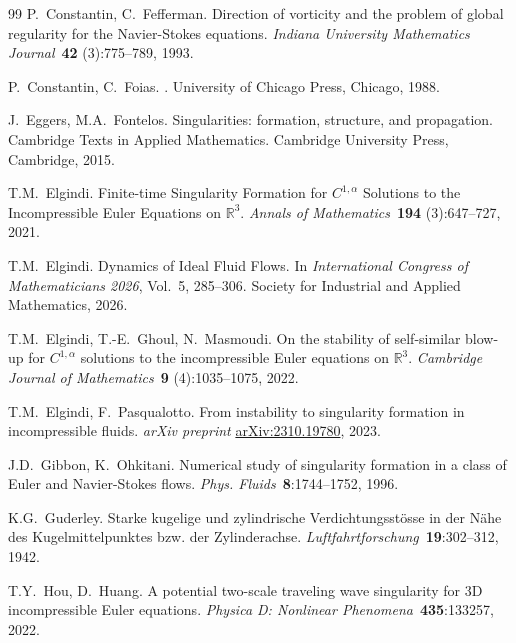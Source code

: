 \documentclass[11pt,reqno]{amsproc}
\numberwithin{equation}{section}
\theoremstyle{remark}
\begin{document}
\begin{thebibliography}{99}
P.~Constantin, C.~Fefferman. 
\newblock Direction of vorticity and the problem of global regularity for the Navier-Stokes equations. 
\newblock \textit{Indiana University Mathematics Journal}~\textbf{42} (3):775--789, 1993.

P.~Constantin, C.~Foias.
.
\newblock University of Chicago Press, Chicago, 1988.
 

J.~Eggers, M.A.~Fontelos.
\newblock Singularities: formation, structure, and propagation.
\newblock Cambridge Texts in Applied Mathematics. Cambridge University Press, Cambridge, 2015.  

T.M.~Elgindi.
\newblock Finite-time Singularity Formation for $C^{1,\alpha}$ Solutions to the Incompressible Euler Equations on $\mathbb{R}^3$. 
\newblock \textit{Annals of Mathematics}~\textbf{194} (3):647--727,  2021.

T.M.~Elgindi. 
\newblock Dynamics of Ideal Fluid Flows.
\newblock In \emph{International Congress of Mathematicians 2026},  Vol.~5, 285--306. Society for Industrial and Applied Mathematics, 2026.


T.M.~Elgindi, T.-E.~Ghoul, N.~Masmoudi. 
\newblock On the stability of self-similar blow-up for $C^{1,\alpha}$ solutions to the incompressible Euler equations on $\mathbb{R}^3$. 
\newblock \textit{Cambridge Journal of Mathematics}~\textbf{9} (4):1035--1075, 2022.

T.M.~Elgindi, F.~Pasqualotto. 
\newblock From instability to singularity formation in incompressible fluids.
\newblock \textit{arXiv preprint} \href{https://arxiv.org/abs/2310.19780}{arXiv:2310.19780}, 2023.

J.D.~Gibbon, K.~Ohkitani. 
\newblock Numerical study of singularity formation in a class of Euler and Navier-Stokes flows.
\newblock \textit{Phys. Fluids}~\textbf{8}:1744--1752, 1996.


K.G.~Guderley.
\newblock Starke kugelige und zylindrische Verdichtungsst{\"o}sse in der
  N{\"a}he des Kugelmittelpunktes bzw. der Zylinderachse.
\newblock \textit{Luftfahrtforschung}~\textbf{19}:302--312, 1942.

T.Y.~Hou, D.~Huang.
\newblock A potential two-scale traveling wave singularity for 3D incompressible Euler equations.
\newblock \textit{Physica D: Nonlinear Phenomena}~\textbf{435}:133257, 2022.


\end{thebibliography}
\end{document}
